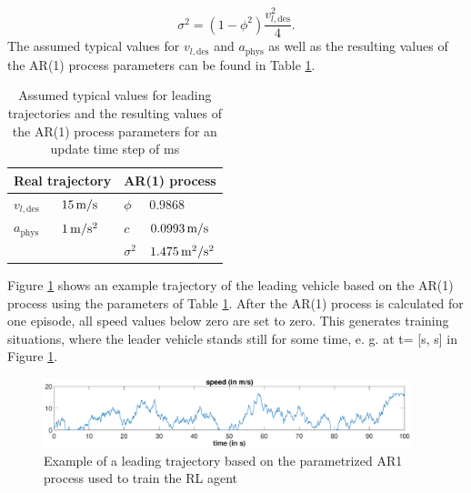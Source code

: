 \documentclass[review]{elsarticle}
\providecommand{\sub}[1]{_{\mathrm{#1}}}  %
\providecommand{\3}{{\ss}}
\begin{document}
\begin{equation}
\sigma^2=(1-\phi^2)\frac{v_{l,\text{des}}^2}{4}.
\end{equation}
The assumed typical values for $v_{l,\text{des}}$ and  $a\sub{phys}$ as well as the resulting values of the AR(1) process parameters can be found in Table \ref{tab:AR1Parameters}.
%
\begin{table}
	\caption{Assumed typical values for leading trajectories and
		the resulting values of the AR(1) process parameters for an
		update time step of \unit[100]{ms}} 
	\label{tab:AR1Parameters} 
	\begin{center}
		\begin{tabular}{ p{} p{} |p{} p{}  }
			\multicolumn{2}{c|}{Real trajectory} & \multicolumn{2}{c}{AR(1) process}   \\ \hline
			$v_{l,\text{des}}$ &$\unit[15]{m/s}$ &$\phi$ & $0.9868$\\
			$a\sub{phys}$ &$\unit[1]{m/s^2}$ &$c$ & $\unit[0.0993]{m/s}$\\
			& & $\sigma^2$ & $\unit[1.475]{m^2/s^2}$
			
		\end{tabular}
	\end{center}
\end{table}
%
Figure \ref{fig:AR1process} shows an example trajectory of the leading
vehicle based on the AR(1) process using the parameters of Table
\ref{tab:AR1Parameters}. After the AR(1) process is calculated for one episode, all speed values below zero are set to zero. This generates training situations, where the leader vehicle stands still for some time, e. g. at t= [\unit[48]{s}, \unit[50]{s}] in Figure \ref{fig:AR1process}. 
\begin{figure}
	\centering
	\includegraphics[width=0.95\textwidth]{images/AR1process}
	\caption{Example of a leading trajectory based on the parametrized AR1 process used to train the RL agent}
	\label{fig:AR1process}
\end{figure}
%
%
%
\end{document}
